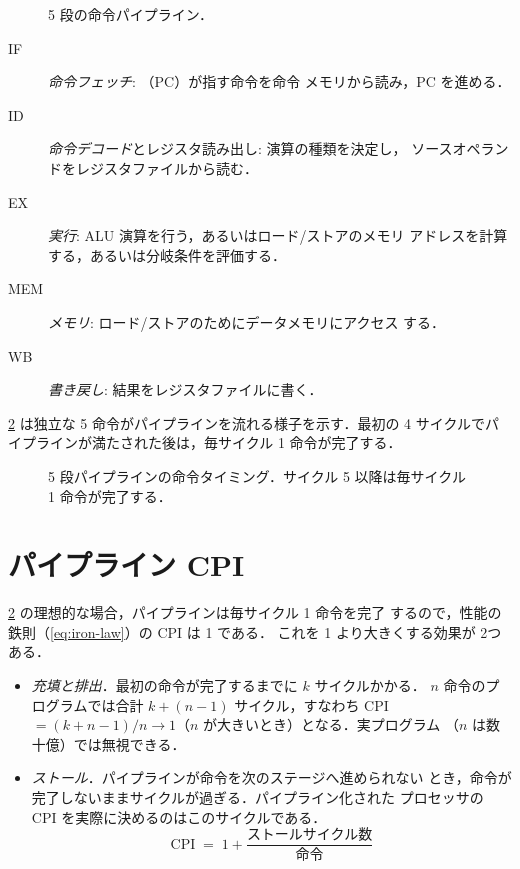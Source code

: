 \documentclass[../main.tex]{subfiles}
\begin{document}
\begin{figure}[htbp]
  \centering
  
  \caption{5 段の命令パイプライン．}
  \label{fig:stages}
\end{figure}

\begin{description}
  \item[IF] \emph{命令フェッチ}: （PC）が指す命令を命令
    メモリから読み，PC を進める．
  \item[ID] \emph{命令デコード}とレジスタ読み出し: 演算の種類を決定し，
    ソースオペランドをレジスタファイルから読む．
  \item[EX] \emph{実行}: ALU 演算を行う，あるいはロード/ストアのメモリ
    アドレスを計算する，あるいは分岐条件を評価する．
  \item[MEM] \emph{メモリ}: ロード/ストアのためにデータメモリにアクセス
    する．
  \item[WB] \emph{書き戻し}: 結果をレジスタファイルに書く．
\end{description}

\cref{fig:timing} は独立な 5 命令がパイプラインを流れる様子を示す．最初の
4 サイクルでパイプラインが満たされた後は，毎サイクル 1 命令が完了する．

\begin{figure}[htbp]
  \centering
  
  \caption{5 段パイプラインの命令タイミング．サイクル 5 以降は毎サイクル
    1 命令が完了する．}
  \label{fig:timing}
\end{figure}

\section{パイプライン CPI}

\cref{fig:timing} の理想的な場合，パイプラインは毎サイクル 1 命令を完了
するので，性能の鉄則（\cref{eq:iron-law}）の CPI は 1 である．
これを 1 より大きくする効果が
2つある．
\begin{itemize}
  \item \emph{充填と排出}．最初の命令が完了するまでに $k$ サイクルかかる．
    $n$ 命令のプログラムでは合計 $k + (n-1)$ サイクル，すなわち
    CPI $= (k+n-1)/n \to 1$（$n$ が大きいとき）となる．実プログラム
    （$n$ は数十億）では無視できる．
  \item \emph{ストール}．パイプラインが命令を次のステージへ進められない
    とき，命令が完了しないままサイクルが過ぎる．パイプライン化された
    プロセッサの CPI を実際に決めるのはこのサイクルである．
    \begin{equation}
      \text{CPI} \;=\; 1 + \frac{\text{ストールサイクル数}}{\text{命令}}
      \label{eq:pipeline-cpi}
    \end{equation}
\end{itemize}
\end{document}
